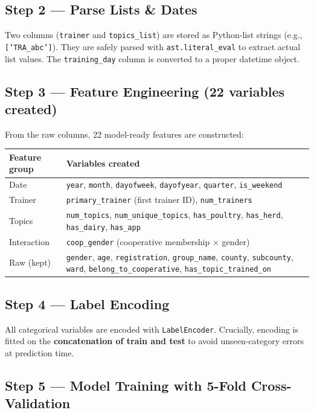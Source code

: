 \documentclass[11pt, a4paper]{article}
\begin{document}
\subsection{Step 2 — Parse Lists \& Dates}
Two columns (\texttt{trainer} and \texttt{topics\_list}) are stored as Python-list strings (e.g., \texttt{['TRA\_abc']}). They are safely parsed with \texttt{ast.literal\_eval} to extract actual list values. The \texttt{training\_day} column is converted to a proper datetime object.

\subsection{Step 3 — Feature Engineering (22 variables created)}

From the raw columns, 22 model-ready features are constructed:

\begin{center}
\small
\begin{tabular}{p{3.4cm} p{9.5cm}}
\toprule
\textbf{Feature group} & \textbf{Variables created} \\
\midrule
Date & \texttt{year}, \texttt{month}, \texttt{dayofweek}, \texttt{dayofyear}, \texttt{quarter}, \texttt{is\_weekend} \\
Trainer & \texttt{primary\_trainer} (first trainer ID), \texttt{num\_trainers} \\
Topics & \texttt{num\_topics}, \texttt{num\_unique\_topics}, \texttt{has\_poultry}, \texttt{has\_herd}, \texttt{has\_dairy}, \texttt{has\_app} \\
Interaction & \texttt{coop\_gender} (cooperative membership $\times$ gender) \\
Raw (kept) & \texttt{gender}, \texttt{age}, \texttt{registration}, \texttt{group\_name}, \texttt{county}, \texttt{subcounty}, \texttt{ward}, \texttt{belong\_to\_cooperative}, \texttt{has\_topic\_trained\_on} \\
\bottomrule
\end{tabular}
\end{center}

\subsection{Step 4 — Label Encoding}
All categorical variables are encoded with \texttt{LabelEncoder}. Crucially, encoding is fitted on the \textbf{concatenation of train and test} to avoid unseen-category errors at prediction time.

\subsection{Step 5 — Model Training with 5-Fold Cross-Validation}
\end{document}
